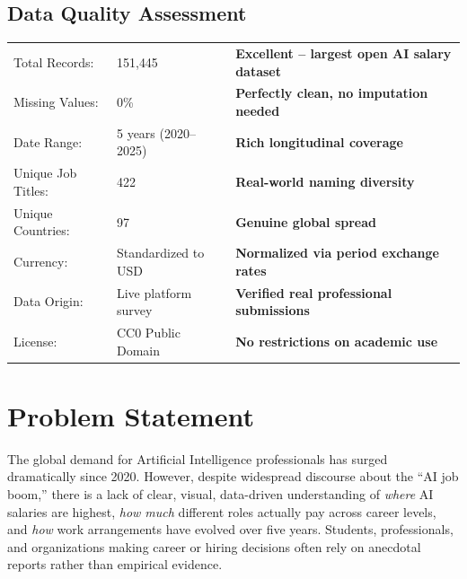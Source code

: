 \documentclass[12pt,a4paper]{article}
\begin{document}
\subsection{Data Quality Assessment}

\begin{kpibox}
\begin{tabularx}{\linewidth}{l l W}
Total Records:     & 151{,}445           & \textcolor{successgreen}{\textbf{Excellent -- largest open AI salary dataset}} \\
Missing Values:    & 0\%                  & \textcolor{successgreen}{\textbf{Perfectly clean, no imputation needed}} \\
Date Range:        & 5 years (2020--2025) & \textcolor{successgreen}{\textbf{Rich longitudinal coverage}} \\
Unique Job Titles: & 422                  & \textcolor{successgreen}{\textbf{Real-world naming diversity}} \\
Unique Countries:  & 97                   & \textcolor{successgreen}{\textbf{Genuine global spread}} \\
Currency:          & Standardized to USD  & \textcolor{successgreen}{\textbf{Normalized via period exchange rates}} \\
Data Origin:       & Live platform survey & \textcolor{successgreen}{\textbf{Verified real professional submissions}} \\
License:           & CC0 Public Domain    & \textcolor{successgreen}{\textbf{No restrictions on academic use}} \\
\end{tabularx}
\end{kpibox}

\section{Problem Statement}

The global demand for Artificial Intelligence professionals has surged dramatically since
2020. However, despite widespread discourse about the ``AI job boom,'' there is a lack of
clear, visual, data-driven understanding of \emph{where} AI salaries are highest,
\emph{how much} different roles actually pay across career levels, and \emph{how} work
arrangements have evolved over five years. Students, professionals, and organizations
making career or hiring decisions often rely on anecdotal reports rather than empirical
evidence.
\end{document}
